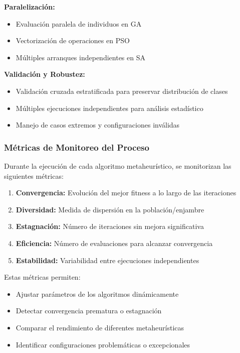 \textbf{Paralelización:}
\begin{itemize}
    \item Evaluación paralela de individuos en GA
    \item Vectorización de operaciones en PSO
    \item Múltiples arranques independientes en SA
\end{itemize}

\textbf{Validación y Robustez:}
\begin{itemize}
    \item Validación cruzada estratificada para preservar distribución de clases
    \item Múltiples ejecuciones independientes para análisis estadístico
    \item Manejo de casos extremos y configuraciones inválidas
\end{itemize}

\subsubsection{Métricas de Monitoreo del Proceso}

Durante la ejecución de cada algoritmo metaheurístico, se monitorizan las siguientes métricas:

\begin{enumerate}
    \item \textbf{Convergencia:} Evolución del mejor fitness a lo largo de las iteraciones
    \item \textbf{Diversidad:} Medida de dispersión en la población/enjambre
    \item \textbf{Estagnación:} Número de iteraciones sin mejora significativa
    \item \textbf{Eficiencia:} Número de evaluaciones para alcanzar convergencia
    \item \textbf{Estabilidad:} Variabilidad entre ejecuciones independientes
\end{enumerate}

Estas métricas permiten:
\begin{itemize}
    \item Ajustar parámetros de los algoritmos dinámicamente
    \item Detectar convergencia prematura o estagnación
    \item Comparar el rendimiento de diferentes metaheurísticas
    \item Identificar configuraciones problemáticas o excepcionales
\end{itemize}

